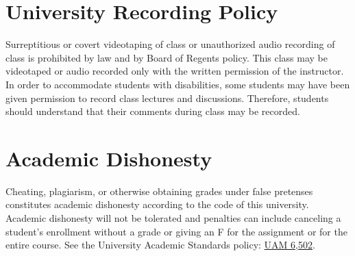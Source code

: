 \documentclass[11pt,onecolumn]{article}
\begin{document}
\section*{University Recording Policy}
Surreptitious or covert videotaping of class or unauthorized audio recording of class is prohibited by law and by Board of Regents policy. This class may be videotaped or audio recorded only with the written permission of the instructor. In order to accommodate students with disabilities, some students may have been given permission to record class lectures and discussions. Therefore, students should understand that their comments during class may be recorded.

\section*{Academic Dishonesty}
Cheating, plagiarism, or otherwise obtaining grades under false pretenses constitutes academic dishonesty according to the code of this university. Academic dishonesty will not be tolerated and penalties can include canceling a student’s enrollment without a grade or giving an F for the assignment or for the entire course. See the University Academic Standards policy: \href{https://www.unr.edu/administrative-manual/6000-6999-curricula-teaching-research/instruction-research-procedures/6502-academic-standards}{UAM 6,502}.
\end{document}
